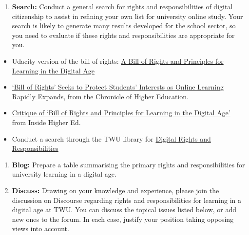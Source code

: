 \documentclass[
]{book}
\providecommand{\tightlist}{%
  \setlength{\itemsep}{0pt}\setlength{\parskip}{0pt}}
\theoremstyle{definition}
\theoremstyle{definition}
\theoremstyle{definition}
\theoremstyle{definition}
\theoremstyle{remark}
\begin{document}
\begin{reflect}
\begin{enumerate}
\def\labelenumi{\arabic{enumi}.}
\tightlist
\item
  \textbf{Search:} Conduct a general search for rights and responsibilities of digital citizenship to assist in refining your own list for university online study. Your search is likely to generate many results developed for the school sector, so you need to evaluate if these rights and responsibilities are appropriate for you.
\end{enumerate}

\begin{itemize}
\item
  Udacity version of the bill of rights: \href{https://www.udacity.com/blog/2013/01/a-bill-of-rights-and-principles-for.html}{A Bill of Rights and Principles for Learning in the Digital Age}
\item
  \href{https://www.chronicle.com/article/bill-of-rights-seeks-to-protect-students-interests-as-online-learning-rapidly-expands/}{`Bill of Rights' Seeks to Protect Students' Interests as Online Learning Rapidly Expands}, from the Chronicle of Higher Education.\\
\item
  \href{https://www.insidehighered.com/blogs/law-policy-and-it/critique-bill-rights-and-principles-learning-digital-age}{Critique of `Bill of Rights and Principles for Learning in the Digital Age'} from Inside Higher Ed.
\item
  Conduct a search through the TWU library for \href{https://twu.idm.oclc.org/login?url=https://search.ebscohost.com/login.aspx?direct=true\&bquery=digital+rights+and+responsibility\&cli0=FT1\&clv0=Y\&type=0\&searchMode=And\&site=eds-live\&scope=site}{Digital Rights and Responsibilities}
\end{itemize}

\begin{enumerate}
\def\labelenumi{\arabic{enumi}.}
\setcounter{enumi}{1}
\item
  \textbf{Blog:} Prepare a table summarising the primary rights and responsibilities for university learning in a digital age.
\item
  \textbf{Discuss:} Drawing on your knowledge and experience, please join the discussion on Discourse regarding rights and responsibilities for learning in a digital age at TWU. You can discuss the topical issues listed below, or add new ones to the forum. In each case, justify your position taking opposing views into account.
\end{enumerate}


\end{reflect}
\end{document}

